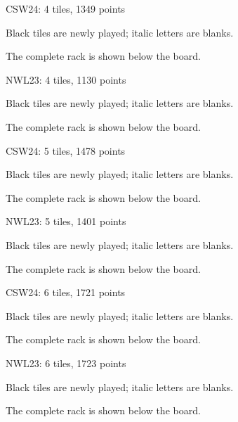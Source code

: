 \documentclass{article}
\begin{document}
\clearpage
\begin{center}
\large CSW24: 4 tiles, 1349 points\par\medskip

\par\medskip\normalsize Black tiles are newly played; italic letters are blanks.\par The complete rack is shown below the board.
\end{center}
\clearpage
\begin{center}
\large NWL23: 4 tiles, 1130 points\par\medskip

\par\medskip\normalsize Black tiles are newly played; italic letters are blanks.\par The complete rack is shown below the board.
\end{center}
\clearpage
\begin{center}
\large CSW24: 5 tiles, 1478 points\par\medskip

\par\medskip\normalsize Black tiles are newly played; italic letters are blanks.\par The complete rack is shown below the board.
\end{center}
\clearpage
\begin{center}
\large NWL23: 5 tiles, 1401 points\par\medskip

\par\medskip\normalsize Black tiles are newly played; italic letters are blanks.\par The complete rack is shown below the board.
\end{center}
\clearpage
\begin{center}
\large CSW24: 6 tiles, 1721 points\par\medskip

\par\medskip\normalsize Black tiles are newly played; italic letters are blanks.\par The complete rack is shown below the board.
\end{center}
\clearpage
\begin{center}
\large NWL23: 6 tiles, 1723 points\par\medskip

\par\medskip\normalsize Black tiles are newly played; italic letters are blanks.\par The complete rack is shown below the board.
\end{center}
\end{document}
